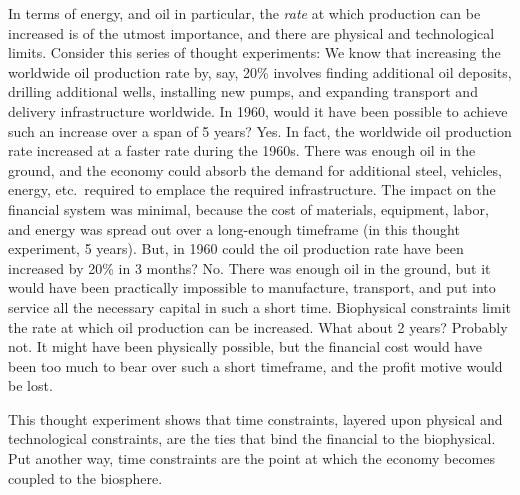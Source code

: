 In terms of energy, and oil in particular, 
the \emph{rate} at which production can be increased 
is of the utmost importance, and
there are physical and technological limits. 
Consider this series of thought experiments:
We know that increasing the worldwide oil production rate by, say, 20\% 
involves
finding additional oil deposits, 
drilling additional wells, 
installing new pumps,
and expanding transport and delivery infrastructure worldwide.
In 1960, would it have been possible to achieve such an increase 
over a span of 5 years?
Yes. 
In fact, the worldwide oil production rate increased at a faster rate 
during the 1960s.
There was enough oil in the ground, 
and the economy could absorb the demand 
for additional steel, vehicles, energy, etc.\ required to emplace
the required infrastructure.
The impact on the financial system was minimal, 
because the cost of materials, equipment, labor, and energy
was spread out over a long-enough timeframe (in this thought experiment, 5 years). 
But, in 1960 could the oil production rate have been increased 
by 20\% in 3 months?
No.
There was enough oil in the ground,
but it would have been practically impossible to manufacture,
transport, and put into service all the necessary capital in such a short time.
Biophysical constraints limit the rate at which oil production can be increased.
What about 2 years?
Probably not.
It might have been physically possible, 
but the financial cost would have been too much to bear over such a short timeframe,
and the profit motive would be lost.

This thought experiment shows that time constraints,
layered upon physical and technological constraints, 
are the ties that bind the financial to the biophysical.
Put another way, time constraints are the point at which the economy 
becomes coupled to the biosphere.

